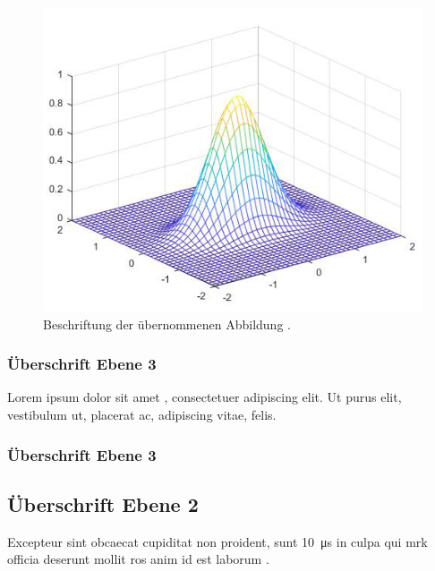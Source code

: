 \begin{figure}[H]
    \centering
    \includegraphics[scale=0.9]{20_Hauptteil/20_Dateien/Bild2.png}
    \caption{Beschriftung der übernommenen Abbildung \cite{web:webseite1}.}
    \label{fig:Bild2}
\end{figure}

\subsubsection{Überschrift Ebene 3}

Lorem ipsum dolor sit amet \cite{zeitschrift:zeitschrifttitel1}, consectetuer adipiscing elit. Ut purus elit, vestibulum ut,
placerat ac, adipiscing vitae, felis.

\begin{quote}
    \textit{\lipsum[2][1-5]}
\end{quote}

\lipsum[1][1-3]

\subsubsection{Überschrift Ebene 3}

\lipsum[1][1-15]

\subsection{Überschrift Ebene 2}

\lipsum[1][1-9]
Excepteur sint obcaecat cupiditat non proident, sunt \SI{10}{\micro\second}
in culpa qui \ac{mrk} officia deserunt mollit \ac{ros} anim id est laborum \cite{datasheet:can}.

